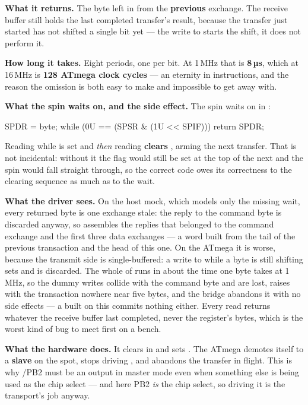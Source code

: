 \textbf{What it returns.} The byte left in  from the \textbf{previous} exchange. The
receive buffer still holds the last completed transfer's result, because the transfer just started
has not shifted a single bit yet --- the write to  starts the shift, it does not perform
it. 

\textbf{How long it takes.} Eight  periods, one per bit. At 1\,MHz that is \textbf{8\,µs},
which at 16\,MHz is \textbf{128 ATmega clock cycles} --- an eternity in instructions, and the reason
the omission is both easy to make and impossible to get away with. 

\textbf{What the spin waits on, and the side effect.} The spin waits on \textbf{} in
:

\begin{cppcode}
SPDR = byte;
while (0U == (SPSR & (1U << SPIF))) {}
return SPDR;
\end{cppcode}

\noindent Reading  while  is set and \emph{then} reading 
\textbf{clears }, arming the next transfer. That is not incidental: without it the flag
would still be set at the top of the next  and the spin would fall straight
through, so the correct code owes its correctness to the clearing sequence as much as to the wait.

\textbf{What the driver sees.} On the host mock, which models only the missing wait, every returned
byte is one exchange stale: the reply to the command byte is discarded anyway, so 
assembles the replies that belonged to the command exchange and the first three data exchanges --- a
 word built from the tail of the previous transaction and the head of this one. On the
ATmega it is worse, because the transmit side is single-buffered: a write to  while a
byte is still shifting sets  and is discarded. The whole of  runs in about
the time one byte takes at 1\,MHz, so the dummy writes collide with the command byte and are lost,
 raises  with the transaction nowhere near five bytes, and the bridge abandons
it with no side effects --- a  built on this  commits nothing either.
Every  read returns whatever the receive buffer last completed, never the register's
bytes, which is the worst kind of bug to meet first on a bench. 

\textbf{What the hardware does.} It clears \textbf{} in  and sets .
The ATmega demotes itself to a \textbf{slave} on the spot, stops driving , and abandons
the transfer in flight. This is why /PB2 must be an output in master mode even when
something else is being used as the chip select --- and here PB2 \emph{is} the chip select, so
driving it is the transport's job anyway. 

